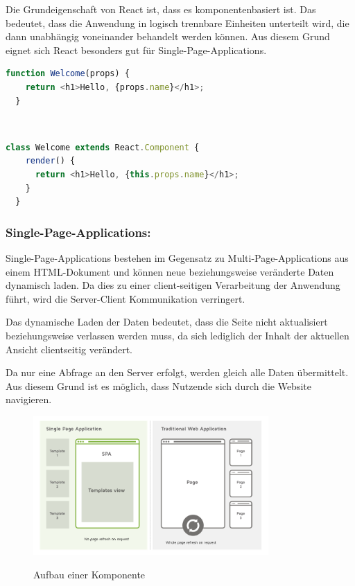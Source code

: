 Die Grundeigenschaft von React ist, dass es komponentenbasiert ist. Das bedeutet, dass die Anwendung in logisch trennbare Einheiten unterteilt wird, die dann unabhängig voneinander behandelt werden können. Aus diesem Grund eignet sich React besonders gut für Single-Page-Applications.
\cite{WasIstReact} \\
 
\begin{lstlisting}[language=JavaScript, caption=Möglicher Aufbau einer Komponente in einer JavaScript-Funktion, label=lst:impl:aufbauJSFunction]
  function Welcome(props) {
    return <h1>Hello, {props.name}</h1>;
  }
\end{lstlisting} \cite{WasIstReact} \\
 
\begin{lstlisting}[language=JavaScript, caption=Möglicher Aufbau einer Komponente in einer JavaScript-Klasse, label=lst:impl:aufbauJSClass]
  class Welcome extends React.Component {
    render() {
      return <h1>Hello, {this.props.name}</h1>;
    }
  }
\end{lstlisting} \cite{WasIstReact}

\subsubsection{Single-Page-Applications:}

Single-Page-Applications bestehen im Gegensatz zu Multi-Page-Applications aus einem HTML-Dokument und können neue beziehungsweise veränderte Daten dynamisch laden. Da dies zu einer client-seitigen Verarbeitung der Anwendung führt, wird die Server-Client Kommunikation verringert.

Das dynamische Laden der Daten bedeutet, dass die Seite nicht aktualisiert beziehungsweise verlassen werden muss, da sich lediglich der Inhalt der aktuellen Ansicht clientseitig verändert.

Da nur eine Abfrage an den Server erfolgt, werden gleich alle Daten übermittelt. Aus diesem Grund ist es möglich, dass Nutzende sich durch die Website navigieren.

\cite{vergleichSPAundMPA} \cite{T3NReact}

\begin{figure}[H]
  \centering
  \includegraphics[width=0.8\textwidth]{pics/vergleichSPA-MPA.png}
  \caption{Aufbau einer Komponente}
  \cite{vergleichSPAundMPA}
\end{figure}

